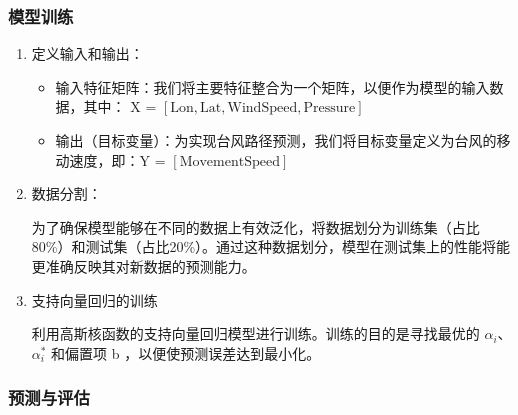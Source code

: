 \documentclass[withoutpreface,bwprint]{cumcmthesis}
\begin{document}
\subsubsection{模型训练}

\begin{enumerate}
    \item[(1)]定义输入和输出：

              \begin{itemize}
                  \item 输入特征矩阵：我们将主要特征整合为一个矩阵，以便作为模型的输入数据，其中： X = $[\text{Lon}, \text{Lat}, \text{WindSpeed}, \text{Pressure}]$ 

                  \item 输出（目标变量）：为实现台风路径预测，我们将目标变量定义为台风的移动速度，即：Y = $[\text{MovementSpeed}]$
              \end{itemize}

    \item[(2)] 数据分割：

            为了确保模型能够在不同的数据上有效泛化，将数据划分为训练集（占比80\%）和测试集（占比20\%）。通过这种数据划分，模型在测试集上的性能将能更准确反映其对新数据的预测能力。

    \item[(3)]支持向量回归的训练

            利用高斯核函数的支持向量回归模型进行训练。训练的目的是寻找最优的 $\alpha_i$、$\alpha_i^*$ 和偏置项 b ，以便使预测误差达到最小化。
\end{enumerate}

\subsubsection{预测与评估}
\end{document}
